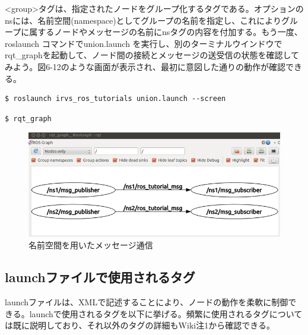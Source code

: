 <group>タグは、指定されたノードをグループ化するタグである。オプションのnsには、名前空間(namespace)としてグループの名前を指定し、これによりグループに属するノードやメッセージの名前にnsタグの内容を付加する。もう一度、roslaunch コマンドでunion.launch を実行し、別のターミナルウインドウでrqt\_graphを起動して、ノード間の接続とメッセージの送受信の状態を確認してみよう。図6-12のような画面が表示され、最初に意図した通りの動作が確認できる。

\begin{lstlisting}[language=ROS]
$ roslaunch irvs_ros_tutorials union.launch --screen
\end{lstlisting}

\begin{lstlisting}[language=ROS]
$ rqt_graph
\end{lstlisting}

\begin{figure}[htp]
  \centering
  \includegraphics[width=\columnwidth]{pictures/chapter6/pic_06_12.png}
  \caption{名前空間を用いたメッセージ通信}
\end{figure}


\subsection{launchファイルで使用されるタグ}

launchファイルは、XMLで記述することにより、ノードの動作を柔軟に制御できる。launchで使用されるタグを以下に挙げる。頻繁に使用されるタグについては既に説明しており、それ以外のタグの詳細もWiki注1から確認できる。

